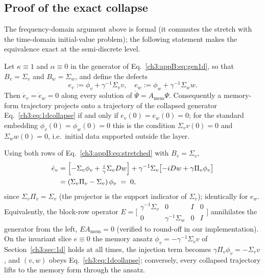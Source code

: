 \subsection{Proof of the exact collapse}
\label{ch3:appB:collapse}

The frequency-domain argument above is formal (it commutes the stretch
with the time-domain initial-value problem); the following statement
makes the equivalence exact at the semi-discrete level.

\begin{lemma}
\label{ch3:appB:lem:collapse}
Let $\kappa\equiv1$ and $\alpha\equiv0$ in the generator of
Eq.~\eqref{ch3:appB:eq:gen1d}, so that $B_v=\Sigma_v$ and
$B_w=\Sigma_w$, and define the defects
\begin{equation}
  e_v := \phi_v + \gamma^{-1}\Sigma_v v,
  \quad
  e_w := \phi_w + \gamma^{-1}\Sigma_w w.
  \label{ch3:appB:eq:defect}
\end{equation}
Then $\dot e_v=\dot e_w=0$ along every solution of
$\dot\Psi=A_{\mathrm{mem}}\Psi$.  Consequently a memory-form trajectory
projects onto a trajectory of the collapsed generator
Eq.~\eqref{ch3:eq:1dcollapse} if and only if $e_v(0)=e_w(0)=0$; for the
standard embedding $\phi_v(0)=\phi_w(0)=0$ this is the condition
$\Sigma_v v(0)=0$ and $\Sigma_w w(0)=0$, i.e.\ initial data supported
outside the layer.
\end{lemma}

\begin{lemproof}
Using both rows of Eq.~\eqref{ch3:appB:eq:stretched} with $B_v=\Sigma_v$,
\begin{equation*}
\begin{split}
  \dot e_v
  &= \Bigl[-\Sigma_v\phi_v+\tfrac{i}{\gamma}\Sigma_vDw\Bigr]
  + \gamma^{-1}\Sigma_v\bigl[-iDw+\gamma\Pi_v\phi_v\bigr]\\
  &= (\Sigma_v\Pi_v-\Sigma_v)\,\phi_v \;=\; 0,
\end{split}
\end{equation*}
since $\Sigma_v\Pi_v=\Sigma_v$ (the projector is the support indicator
of $\Sigma_v$); identically for $e_w$.  Equivalently, the block-row
operator
$E=\bigl[\begin{smallmatrix}
\gamma^{-1}\Sigma_v & 0 & I & 0\\
0 & \gamma^{-1}\Sigma_w & 0 & I
\end{smallmatrix}\bigr]$
annihilates the generator from the left, $EA_{\mathrm{mem}}=0$
(verified to round-off in our implementation).  On the invariant slice
$e\equiv0$ the memory ansatz $\phi_v=-\gamma^{-1}\Sigma_v v$ of
Section~\ref{ch3:sec:1d} holds at all times, the injection term becomes
$\gamma\Pi_v\phi_v=-\Sigma_v v$, and $(v,w)$ obeys
Eq.~\eqref{ch3:eq:1dcollapse}; conversely, every collapsed trajectory lifts
to the memory form through the ansatz.
\end{lemproof}

